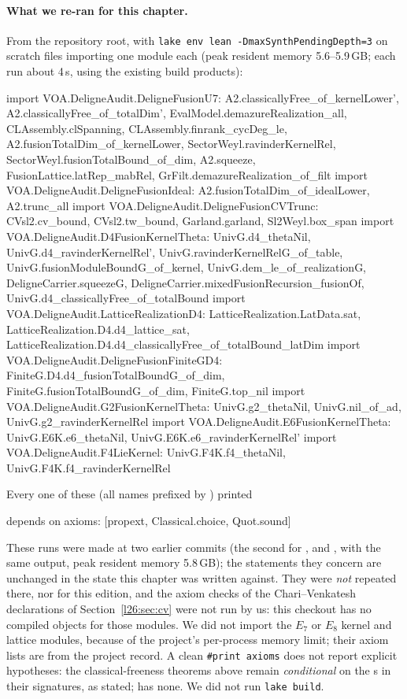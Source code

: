\paragraph{What we re-ran for this chapter.} From the repository root, with \texttt{lake env lean -DmaxSynthPendingDepth=3} on
scratch files importing one module each (peak resident memory 5.6--5.9\,GB; each run about 4\,s, using the existing build products):
\begin{plaincode}
import VOA.DeligneAudit.DeligneFusionU7:
  A2.classicallyFree_of_kernelLower', A2.classicallyFree_of_totalDim',
  EvalModel.demazureRealization_all, CLAssembly.clSpanning,
  CLAssembly.finrank_cycDeg_le, A2.fusionTotalDim_of_kernelLower,
  SectorWeyl.ravinderKernelRel, SectorWeyl.fusionTotalBound_of_dim,
  A2.squeeze, FusionLattice.latRep_mabRel, GrFilt.demazureRealization_of_filt
import VOA.DeligneAudit.DeligneFusionIdeal:
  A2.fusionTotalDim_of_idealLower, A2.trunc_all
import VOA.DeligneAudit.DeligneFusionCVTrunc:
  CVsl2.cv_bound, CVsl2.tw_bound, Garland.garland, Sl2Weyl.box_span
import VOA.DeligneAudit.D4FusionKernelTheta:
  UnivG.d4_thetaNil, UnivG.d4_ravinderKernelRel', UnivG.ravinderKernelRelG_of_table,
  UnivG.fusionModuleBoundG_of_kernel, UnivG.dem_le_of_realizationG,
  DeligneCarrier.squeezeG, DeligneCarrier.mixedFusionRecursion_fusionOf,
  UnivG.d4_classicallyFree_of_totalBound
import VOA.DeligneAudit.LatticeRealizationD4:
  LatticeRealization.LatData.sat, LatticeRealization.D4.d4_lattice_sat,
  LatticeRealization.D4.d4_classicallyFree_of_totalBound_latDim
import VOA.DeligneAudit.DeligneFusionFiniteGD4:
  FiniteG.D4.d4_fusionTotalBoundG_of_dim, FiniteG.fusionTotalBoundG_of_dim,
  FiniteG.top_nil
import VOA.DeligneAudit.G2FusionKernelTheta:
  UnivG.g2_thetaNil, UnivG.nil_of_ad, UnivG.g2_ravinderKernelRel
import VOA.DeligneAudit.E6FusionKernelTheta:
  UnivG.E6K.e6_thetaNil, UnivG.E6K.e6_ravinderKernelRel'
import VOA.DeligneAudit.F4LieKernel:
  UnivG.F4K.f4_thetaNil, UnivG.F4K.f4_ravinderKernelRel
\end{plaincode}
Every one of these (all names prefixed by ) printed
\begin{plaincode}
depends on axioms: [propext, Classical.choice, Quot.sound]
\end{plaincode}
These runs were made at two earlier commits (the second for
,  and , with the
same output, peak resident memory 5.8\,GB); the statements they concern are unchanged in the state this chapter was written against. They were \emph{not}
repeated there, nor for this edition, and the axiom checks of the Chari--Venkatesh declarations of Section~\ref{l26:sec:cv} were not run
by us: this checkout has no compiled objects for those modules. We did not import the $E_7$ or $E_8$ kernel and lattice modules, because of the project's per-process memory limit;
their axiom lists are from the project record.
A clean \texttt{\#print axioms} does not report explicit hypotheses: the classical-freeness theorems above remain
\emph{conditional} on the s in their signatures, as stated;  has none. We did not run \texttt{lake build}.

